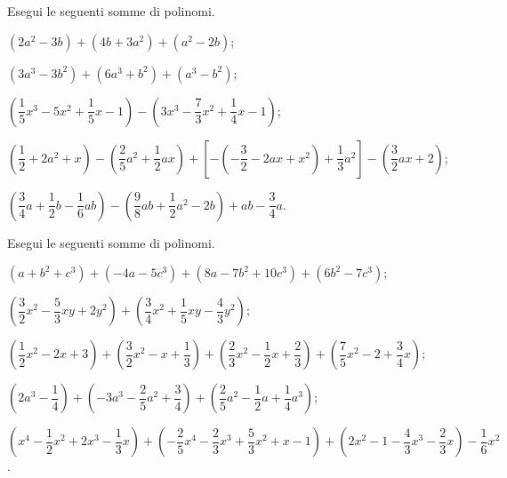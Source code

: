 \begin{esercizio}[\Ast]
\label{ese:11.14}
 Esegui le seguenti somme di polinomi.

 \begin{enumeratea}
 \item $\left(2a^{2}-3b\right)+\left(4b+3a^{2}\right)+\left(a^{2}-2b\right)$;
 \item $\left(3a^{3}-3b^{2}\right)+\left(6a^{3}+b^{2}\right)+\left(a^{3}-b^{2}\right)$;
 \item $\left(\dfrac{1}{5}x^{3}-5x^{2}+\dfrac{1}{5}x-1\right)-\left(3x^{3}-\dfrac{7}{3}x^{2}+\dfrac{1}{4}x-1\right)$;
 \item $\left(\dfrac{1}{2}+2a^{2}+x\right)-\left(\dfrac{2}{5}a^{2}+\dfrac{1}{2}{ax}\right)+\left[-\left(-{\dfrac{3}{2}}-2{ax}+x^{2}\right)+\dfrac{1}{3}a^{2}\right]-\left(\dfrac{3}{2}{ax}+2\right)$;
 \item $\left(\dfrac{3}{4}a+\dfrac{1}{2}b-\dfrac{1}{6}{ab}\right)-\left(\dfrac{9}{8}{ab}+\dfrac{1}{2}a^{2}-2b\right)+{ab}-\dfrac{3}{4}a$.
\end{enumeratea}
\end{esercizio}

\begin{esercizio}[\Ast]
\label{ese:11.15} %
 Esegui le seguenti somme di polinomi.

 \begin{enumeratea}
 \item $\left(a+b^{2}+c^{3}\right)+\left(-4a-5c^{3}\right)+\left(8a-7b^{2}+10c^{3}\right)+\left(6b^{2}-7c^{3}\right)$;
 \item $\left(\dfrac{3}{2}x^{2}-\dfrac{5}{3}xy+2y^{2}\right)+\left(\dfrac{3}{4}x^{2}+\dfrac{1}{5}xy-\dfrac{4}{3}y^{2}\right)$;
 \item $\left(\dfrac{1}{2}x^{2}-2x+3\right)+\left(\dfrac{3}{2}x^{2}-x+\dfrac{1}{3}\right)+\left(\dfrac{2}{3}x^{2}-\dfrac{1}{2}x+\dfrac{2}{3}\right)+\left(\dfrac{7}{5}x^{2}-2+\dfrac{3}{4}x\right)$;
 \item $\left(2a^{3}-\dfrac{1}{4}\right)+\left(-3a^{3}-\dfrac{2}{5}a^{2}+\dfrac{3}{4}\right)+\left(\dfrac{2}{5}a^{2}-\dfrac{1}{2}a+\dfrac{1}{4}a^{3}\right)$;
 \item $\left(x^{4}-\dfrac{1}{2}x^{2}+2x^{3}-\dfrac{1}{3}x\right)+\left(-\dfrac{2}{5}x^{4}-\dfrac{2}{3}x^{3}+\dfrac{5}{3}x^{2}+x-1\right)+\left(2x^{2}-1-\dfrac{4}{3}x^{3}-\dfrac{2}{3}x\right)-\dfrac{1}{6}x^2$.
\end{enumeratea}
\end{esercizio}

